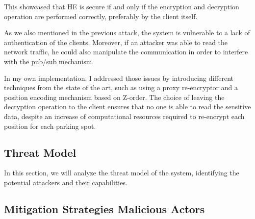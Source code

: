 This showcased that HE is secure if and only if the encryption and decryption operation are performed correctly, preferably by the client itself.

As we also mentioned in the previous attack, the system is vulnerable to a lack of authentication of the clients. Moreover, if an attacker was able to read the network traffic, he could also manipulate the communication in order to interfere with the pub/sub mechanism.

In my own implementation, I addressed those issues by introducing different techniques from the state of the art, such as using a proxy re-encryptor and a position encoding mechanism based on Z-order. The choice of leaving the decryption operation to the client ensures that no one is able to read the sensitive data, despite an increase of computational resources required to re-encrypt each position for each parking spot.

\subsection{Threat Model} \label{subsec:threatmodel}

In this section, we will analyze the threat model of the system, identifying the potential attackers and their capabilities. 


\subsection{Mitigation Strategies Malicious Actors}

